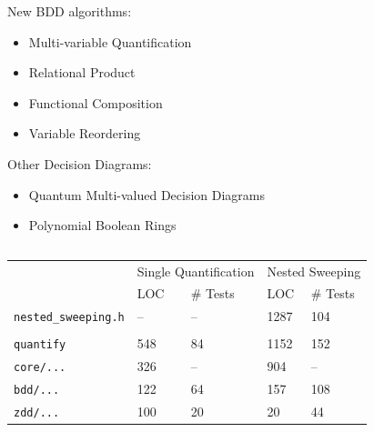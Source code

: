 \documentclass[english, aspectratio=169]{beamer}
\begin{document}
\begin{frame}
\begin{columns}
\begin{column}{0.58\linewidth}
      New BDD algorithms:
      \begin{itemize}
      \item[\faIcon{check-circle}] Multi-variable Quantification
      \item[\faIcon{check-circle}] Relational Product
      \item[\faIcon{circle}]       Functional Composition
      \item[\faIcon{circle}]       Variable Reordering
      \end{itemize}

      Other Decision Diagrams:
      \begin{itemize}
      \item[\faIcon{circle}]       Quantum Multi-valued Decision Diagrams
      \item[\faIcon{circle}]       Polynomial Boolean Rings
      \end{itemize}
    \end{column}
  \end{columns}
\end{frame}

\begin{frame}
  \begin{table}
    \centering
    \begin{tabular}{l||ll|ll}
                                   & \multicolumn{2}{c|}{Single Quantification} & \multicolumn{2}{c}{Nested Sweeping}
      \\
                                   & LOC & \# Tests                              & LOC  & \# Tests
      \\ \hline \hline
      \texttt{nested\_sweeping.h}  & --  & --                                    & 1287 & 104
      \\
                                   &     &                                       &      &
      \\
      \texttt{quantify}            & 548 & 84                                    & 1152 & 152
      \\
      \quad \texttt{core/...}      & 326 & --                                    & 904  & --
      \\
      \quad \texttt{bdd/...}       & 122 & 64                                    & 157  & 108
      \\
      \quad \texttt{zdd/...}       & 100 & 20                                    & 20   & 44
    \end{tabular}
  \end{table}
\end{frame}

\begin{frame}
  \begin{figure}
    \centering

    \begin{tikzpicture}
      
    \end{tikzpicture}
  \end{figure}
\end{frame}
\end{document}
